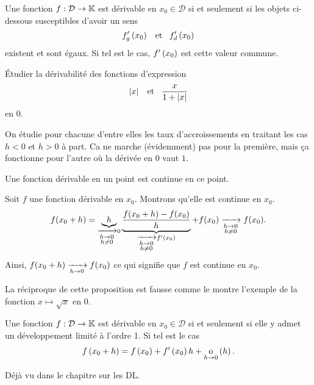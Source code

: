 \documentclass{magnoliaold}
\begin{document}

\begin{proposition}[utile=-3]
Une fonction $f:\mathcal{D}\to\mathbb{K}$ est dérivable en $x_0\in\mathcal{D}$ si
et seulement si les objets ci-dessous susceptibles d'avoir un sens
\[f_g'\left(x_0\right) \quad\!\text{et}\quad\! f_d'\left(x_0\right)\]
existent et sont égaux. Si tel est le cas, $f'\left(x_0\right)$ est cette valeur commune.
\end{proposition}

\begin{exoUnique}
\exo Étudier la dérivabilité des fonctions d'expression
  \[\left|x\right| \quad\!\text{et}\quad\! \frac{x}{1+\left|x\right|}\]
  en 0.
\end{exoUnique}
\begin{sol}
On étudie pour chacune d'entre elles les taux d'accroissements en traitant les cas $h<0$ et $h>0$ à part. Ca ne marche (évidemment) pas pour la première, mais ça fonctionne pour l'autre où la dérivée en $0$ vaut $1$.
\end{sol}

\begin{proposition}[utile=-3]
Une fonction dérivable en un point est continue en ce point.
\end{proposition}

\begin{preuve}
Soit $f$ une fonction dérivable en $x_0$. Montrons qu'elle est continue en $x_0$.
$$f(x_0+h)=\underbrace{h}_{\xrightarrow[ \substack{h\rightarrow 0 \\ h\not=0}]{}0}\underbrace{\frac{f(x_0+h)-f(x_0)}{h}}_{\xrightarrow[ \substack{h\rightarrow 0 \\ h\not=0}]{}f'(x_0)}+f(x_0)\xrightarrow[ \substack{h\rightarrow 0 \\ h\not=0}]{}f(x_0).$$
Ainsi, $f(x_0+h)\xrightarrow[h\rightarrow 0]{}f(x_0)$ ce qui signifie que $f$ est continue en $x_0$.
\end{preuve}

\begin{remarqueUnique}
\remarque La réciproque de cette proposition est fausse comme le montre l'exemple de la fonction
  $x\mapsto\sqrt{x}$ en 0.
\end{remarqueUnique}


\begin{proposition}[utile=-3]
Une fonction $f:\mathcal{D}\to\mathbb{K}$ est dérivable en $x_0\in\mathcal{D}$ si et seulement si elle
y admet un développement limité à l'ordre 1. Si tel est le cas
\[f\left(x_0+h\right)=f\left(x_0\right)+f'\left(x_0\right)h+\underset{h \rightarrow 0}{\text{o}}\left(h\right).\]
\end{proposition}

\begin{preuve}
Déjà vu dans le chapitre sur les DL.
\end{preuve}
\end{document}
